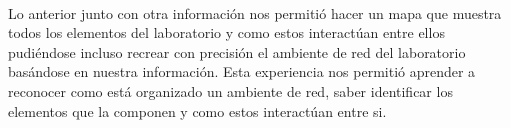 \documentclass[spanish]{udpreport}
\begin{document}
\\

\setlength{\parindent}{0.5cm} Lo anterior junto con otra información nos permitió hacer un mapa que muestra todos los elementos del laboratorio y como estos interactúan entre ellos pudiéndose incluso recrear con precisión el ambiente de red del laboratorio basándose en nuestra información. Esta experiencia nos permitió aprender a reconocer como está organizado un ambiente de red, saber identificar los elementos que la componen y como estos interactúan entre si.
\end{document}
